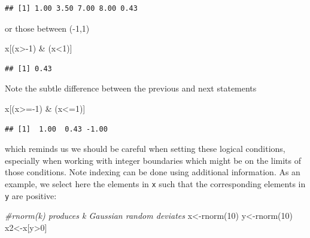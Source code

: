 \documentclass[
]{article}
\newenvironment{Shaded}{\begin{snugshade}}{\end{snugshade}}
\newcommand{\CommentTok}[1]{\textcolor[rgb]{0.56,0.35,0.01}{\textit{#1}}}
\newcommand{\DecValTok}[1]{\textcolor[rgb]{0.00,0.00,0.81}{#1}}
\newcommand{\FunctionTok}[1]{\textcolor[rgb]{0.00,0.00,0.00}{#1}}
\newcommand{\NormalTok}[1]{#1}
\newcommand{\OtherTok}[1]{\textcolor[rgb]{0.56,0.35,0.01}{#1}}
\newcommand{\SpecialCharTok}[1]{\textcolor[rgb]{0.00,0.00,0.00}{#1}}
\begin{document}
\begin{verbatim}
## [1] 1.00 3.50 7.00 8.00 0.43
\end{verbatim}

\noindent or those between (-1,1)

\begin{Shaded}
\begin{Highlighting}[]
\NormalTok{x[(x}\SpecialCharTok{\textgreater{}{-}}\DecValTok{1}\NormalTok{) }\SpecialCharTok{\&}\NormalTok{ (x}\SpecialCharTok{\textless{}}\DecValTok{1}\NormalTok{)]}
\end{Highlighting}
\end{Shaded}

\begin{verbatim}
## [1] 0.43
\end{verbatim}

Note the subtle difference between the previous and next statements

\begin{Shaded}
\begin{Highlighting}[]
\NormalTok{x[(x}\SpecialCharTok{\textgreater{}={-}}\DecValTok{1}\NormalTok{) }\SpecialCharTok{\&}\NormalTok{ (x}\SpecialCharTok{\textless{}=}\DecValTok{1}\NormalTok{)]}
\end{Highlighting}
\end{Shaded}

\begin{verbatim}
## [1]  1.00  0.43 -1.00
\end{verbatim}

\noindent which reminds us we should be careful when setting these
logical conditions, especially when working with integer boundaries
which might be on the limits of those conditions. Note indexing can be
done using additional information. As an example, we select here the
elements in \texttt{x} such that the corresponding elements in
\texttt{y} are positive:

\begin{Shaded}
\begin{Highlighting}[]
\CommentTok{\#rnorm(k) produces k Gaussian random deviates}
\NormalTok{x}\OtherTok{\textless{}{-}}\FunctionTok{rnorm}\NormalTok{(}\DecValTok{10}\NormalTok{)}
\NormalTok{y}\OtherTok{\textless{}{-}}\FunctionTok{rnorm}\NormalTok{(}\DecValTok{10}\NormalTok{)}
\NormalTok{x2}\OtherTok{\textless{}{-}}\NormalTok{x[y}\SpecialCharTok{\textgreater{}}\DecValTok{0}\NormalTok{]}
\end{Highlighting}
\end{Shaded}
\end{document}
